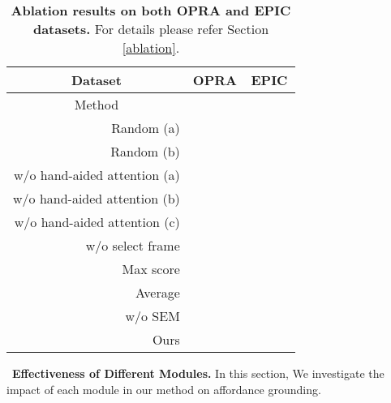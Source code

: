 \documentclass[journal,twoside]{IEEEtran}
\newcommand{\myPara}[1]{\vspace{5pt}\noindent~\textbf{#1} \quad}
\begin{document}
\begin{table*}[t]
\caption{\textbf{Ablation results on both OPRA \cite{demo2vec2018cvpr} and EPIC \cite{Damen2018EPICKITCHENS} datasets.} For details please refer Section \ref{ablation}.}
  \label{Table:5}
  \begin{center}
  \small
  \renewcommand{\arraystretch}{1.}
  \renewcommand{\tabcolsep}{12.1pt}
  \begin{tabular}{r|cccc|cccc}
    \hline\toprule
    \multicolumn{1}{c|}{\textbf{Dataset}} & \multicolumn{4}{c|}{\textbf{OPRA} \cite{demo2vec2018cvpr}} & \multicolumn{4}{c}{\textbf{EPIC} \cite{Damen2018EPICKITCHENS}} \\ 
    \hline
    \multicolumn{1}{c|}{Method} & \emph{} & \emph{} & \emph{} & \emph{} & \emph{} & \emph{} & \emph{} & \emph{} \\ 
    \hline
    Random (a) &  &  & 	&  &  &	 &	  &  \\
    Random (b) &  &  &  &  &  &	 &	  &  \\
    w/o hand-aided attention (a) &  &		&  &	 &  & 	 &  &	 \\
    w/o hand-aided attention (b) &  &  &	 &  & 	 &   &  &   \\
    w/o hand-aided attention (c) &  &  &  &  &  & 	&  &	   \\
    w/o select frame &  &  &  &  &  &  &  &  \\
    \hline
    Max score   &  &  &  &  &  &  &  &  \\
    Average    &  &  &  &  &  &  &  &  \\
    \hline
    w/o SEM &  &		&  & 	 &  &  &	 &  \\
    \hline
    \rowcolor{mygray}
    Ours &  &	 &  &  &  &  &  &     \\
    \hline\bottomrule
    \end{tabular}
    \end{center}
 \end{table*}

\myPara{Effectiveness of Different Modules.}
In this section, We investigate the impact of each module in our method on affordance grounding.
\end{document}

